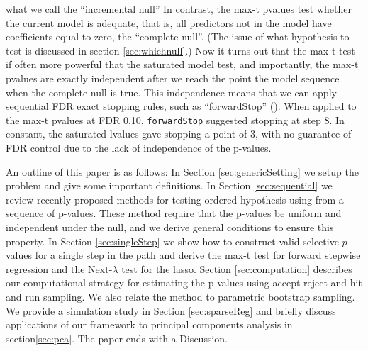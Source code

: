 \documentclass{article}
\begin{document}
what we call the ``incremental null''
In contrast, the max-t pvalues test whether the current model is adequate, that is, all predictors not in the model  have coefficients equal to zero,
the ``complete null''. (The issue of what hypothesis to test is discussed in section \ref{sec:whichnull}.)
Now it turns out that the max-t test if often more powerful that the saturated model test, and importantly, the max-t pvalues are exactly
independent after we reach the point the model sequence when the complete null is true. This independence means that we can apply
sequential FDR exact stopping rules, such as ``forwardStop'' (\citet{gsell2013sequential}). When applied to the max-t pvalues at FDR 0.10, {\tt forwardStop}
suggested stopping at step 8. In constant, the saturated lvalues gave stopping a point of 3, with no guarantee of FDR control
due to the lack of independence of the p-values.

An outline of this paper is as follows:
In Section \ref{sec:genericSetting} we setup the problem and give some important definitions. In Section \ref{sec:sequential} we review recently proposed methods for
testing ordered hypothesis using from a sequence of p-values. These method require that the p-values be uniform and independent under the null, and we derive general conditions
to ensure this property. In Section \ref{sec:singleStep}  we  show how to construct valid selective $p$-values for a single step in the path and derive the max-t test
for  forward stepwise regression and the Next-$\lambda$ test for the lasso. Section \ref{sec:computation}  describes our computational strategy for estimating the p-values using accept-reject and hit and run sampling. We also relate the method to parametric bootstrap sampling. We provide a simulation study in Section \ref{sec:sparseReg} and briefly discuss applications of our framework to
principal components analysis in section\ref{sec:pca}. The paper ends with a Discussion.



\end{document}
